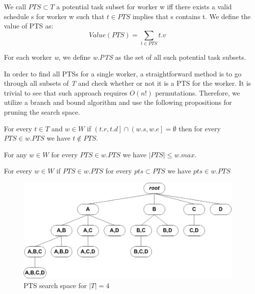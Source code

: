 \begin{definition} 
\label{def:PTS}
We call $PTS \subset T$ a potential task subset for worker w iff there exists a valid schedule s for worker w such that $t \in PTS$ implies that s contains t. We define the value of PTS as:
\begin{equation*}
Value(PTS) = \sum_{t \in PTS} t.v
\end{equation*}
\end{definition}

\noindent For each worker \emph{w}, we define \emph{w.PTS} as the set of all such potential task subsets.

In order to find all PTSs for a single worker, a straightforward method is to go through all subsets of \emph{T} and check whether or not it is a PTS for the worker. It is trivial to see that such approach requires $O(n!)$ permutations. Therefore, we utilize a branch and bound algorithm and use the following propositions for pruning the search space.

\begin{proposition}
\label{prop:overlap}
For every $t \in T$ and $w \in W$ if $\left(t.r, t.d \right] \cap \left( w.s, w.e \right] = \emptyset$ then for every $PTS \in w.PTS$ we have $t \not\in PTS$.
\end{proposition}

\begin{proposition}
\label{prop:size}
For any $w \in W$ for every $PTS \in w.PTS$ we have $\left\vert{PTS}\right\vert \leq w.max$.
\end{proposition}

\begin{proposition}
\label{prop:subset}
For every $w \in W$ if $PTS \in w.PTS$ for every $pts \subset PTS$ we have $pts \in w.PTS$
\end{proposition}

\begin{figure}[t]
	\centering
	\includegraphics[width = 0.85\columnwidth]{figures/PTS_tree.png}
			\vspace{-0.2cm}
	\caption{PTS search space for $\left\vert T \right\vert = 4$}
	\label{fig:PTS_tree}
			\vspace{-0.2cm}
\end{figure}

